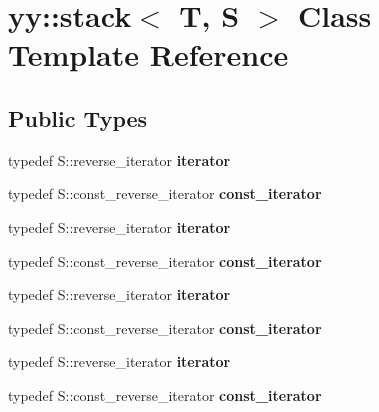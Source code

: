 \hypertarget{classyy_1_1stack}{\section{yy\-:\-:stack$<$ T, S $>$ Class Template Reference}
\label{classyy_1_1stack}
}
\subsection*{Public Types}
\begin{DoxyCompactItemize}
\item 
\hypertarget{classyy_1_1stack_a959921144f243952520a2178121cbe6f}{typedef S\-::reverse\-\_\-iterator {\bfseries iterator}}\label{classyy_1_1stack_a959921144f243952520a2178121cbe6f}

\item 
\hypertarget{classyy_1_1stack_a0cab3a74b0947ce6de68c3520b9229ab}{typedef S\-::const\-\_\-reverse\-\_\-iterator {\bfseries const\-\_\-iterator}}\label{classyy_1_1stack_a0cab3a74b0947ce6de68c3520b9229ab}

\item 
\hypertarget{classyy_1_1stack_a959921144f243952520a2178121cbe6f}{typedef S\-::reverse\-\_\-iterator {\bfseries iterator}}\label{classyy_1_1stack_a959921144f243952520a2178121cbe6f}

\item 
\hypertarget{classyy_1_1stack_a0cab3a74b0947ce6de68c3520b9229ab}{typedef S\-::const\-\_\-reverse\-\_\-iterator {\bfseries const\-\_\-iterator}}\label{classyy_1_1stack_a0cab3a74b0947ce6de68c3520b9229ab}

\item 
\hypertarget{classyy_1_1stack_a959921144f243952520a2178121cbe6f}{typedef S\-::reverse\-\_\-iterator {\bfseries iterator}}\label{classyy_1_1stack_a959921144f243952520a2178121cbe6f}

\item 
\hypertarget{classyy_1_1stack_a0cab3a74b0947ce6de68c3520b9229ab}{typedef S\-::const\-\_\-reverse\-\_\-iterator {\bfseries const\-\_\-iterator}}\label{classyy_1_1stack_a0cab3a74b0947ce6de68c3520b9229ab}

\item 
\hypertarget{classyy_1_1stack_a959921144f243952520a2178121cbe6f}{typedef S\-::reverse\-\_\-iterator {\bfseries iterator}}\label{classyy_1_1stack_a959921144f243952520a2178121cbe6f}

\item 
\hypertarget{classyy_1_1stack_a0cab3a74b0947ce6de68c3520b9229ab}{typedef S\-::const\-\_\-reverse\-\_\-iterator {\bfseries const\-\_\-iterator}}\label{classyy_1_1stack_a0cab3a74b0947ce6de68c3520b9229ab}

\end{DoxyCompactItemize}
